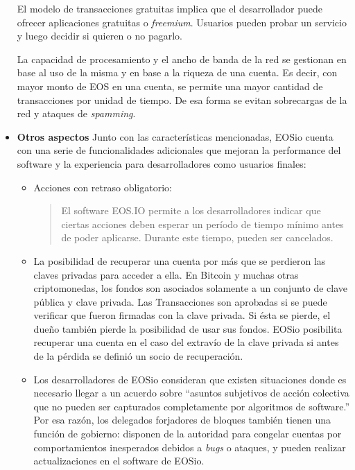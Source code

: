\begin{itemize}
El modelo de transacciones gratuitas implica que el desarrollador puede ofrecer aplicaciones gratuitas o \textit{freemium}. Usuarios pueden probar un servicio y luego decidir si quieren o no pagarlo.

La capacidad de procesamiento y el ancho de banda de la red se gestionan en base al uso de la misma y en base a la riqueza de una cuenta. Es decir, con mayor monto de EOS en una cuenta, se permite una mayor cantidad de transacciones por unidad de tiempo. De esa forma se evitan sobrecargas de la red y ataques de \textit{spamming}.

\item \textbf{Otros aspectos} \newline
Junto con las características mencionadas, EOSio cuenta con una serie de funcionalidades adicionales que mejoran la performance del software y la experiencia para desarrolladores como usuarios finales:
\begin{itemize}
\item [\textendash] Acciones con retraso obligatorio: 
\begin{quote}
El software EOS.IO permite a los desarrolladores indicar que ciertas acciones deben esperar un período de tiempo mínimo antes de poder aplicarse. Durante este tiempo, pueden ser cancelados.\cite{eosio_tech_whitepaper}
\end{quote}
\item [\textendash] La posibilidad de recuperar una cuenta por más que se perdieron las claves privadas para acceder a ella. En Bitcoin y muchas otras criptomonedas, los fondos son asociados solamente a un conjunto de clave pública y clave privada. Las Transacciones son aprobadas si se puede verificar que fueron firmadas con la clave privada. Si ésta se pierde, el dueño también pierde la posibilidad de usar sus fondos.
EOSio posibilita recuperar una cuenta en el caso del extravío de la clave privada si antes de la pérdida se definió un socio de recuperación.

\item [\textendash] Los desarrolladores de EOSio consideran que existen situaciones donde es necesario llegar a un acuerdo sobre ``asuntos subjetivos de acción colectiva que no pueden ser capturados completamente por algoritmos de software.''\cite{eosio_tech_whitepaper} Por esa razón, los delegados forjadores de bloques también tienen una función de gobierno: disponen de la autoridad para congelar cuentas por comportamientos inesperados debidos a \textit{bugs} o ataques, y pueden realizar actualizaciones en el software de EOSio.
\end{itemize}
\end{itemize}

